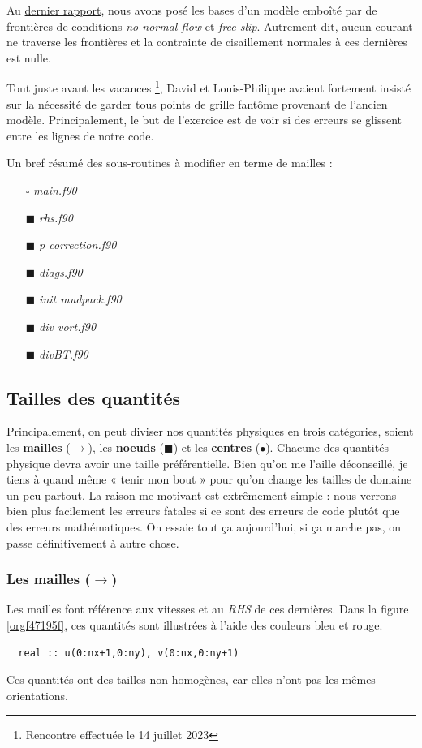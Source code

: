 \documentclass[10pt]{article}
\numberwithin{equation}{section}
\renewcommand{\boxtimes}{\blacksquare}
\begin{document}
Au \href{rapport-2023-07-07.org}{dernier rapport}, nous avons posé les bases d'un modèle emboîté par de frontières de conditions \emph{no normal flow} et \emph{free slip}.
Autrement dit, aucun courant ne traverse les frontières et la contrainte de cisaillement normales à ces dernières est nulle. \bigskip

Tout juste avant les vacances \footnote{Rencontre effectuée le 14 juillet 2023}, David et Louis-Philippe avaient fortement insisté sur la nécessité de garder tous points de grille fantôme provenant de l'ancien modèle.
Principalement, le but de l'exercice est de voir si des erreurs se glissent entre les lignes de notre code. \bigskip

Un bref résumé des sous-routines à modifier en terme de mailles : 
\begin{itemize}
\item[{$\square$}] \emph{main.f90}
\item[{$\boxtimes$}] \emph{rhs.f90}
\item[{$\boxtimes$}] \emph{p correction.f90}
\item[{$\boxtimes$}] \emph{diags.f90}
\item[{$\boxtimes$}] \emph{init mudpack.f90}
\item[{$\boxtimes$}] \emph{div vort.f90}
\item[{$\boxtimes$}] \emph{divBT.f90}
\end{itemize}


\subsection{Tailles des quantités}
\label{sec:org7f68463}
Principalement, on peut diviser nos quantités physiques en trois catégories, soient les \textbf{mailles} (\(\rightarrow\)), les \textbf{noeuds} (\(\blacksquare\)) et les \textbf{centres} (\(\bullet\)).
Chacune des quantités physique devra avoir une taille préférentielle.
Bien qu'on me l'aille déconseillé, je tiens à quand même « tenir mon bout » pour qu'on change les tailles de domaine un peu partout.
La raison me motivant est extrêmement simple : nous verrons bien plus facilement les erreurs fatales si ce sont des erreurs de code plutôt que des erreurs mathématiques.
On essaie tout ça aujourd'hui, si ça marche pas, on passe définitivement à autre chose.

\subsubsection{Les mailles (\(\rightarrow\))}
\label{sec:org390065d}
Les mailles font référence aux vitesses et au \emph{RHS} de ces dernières. 
Dans la figure \ref{orgf47195f}, ces quantités sont illustrées à l'aide des couleurs bleu et rouge.
\begin{verbatim}
  real :: u(0:nx+1,0:ny), v(0:nx,0:ny+1)
\end{verbatim}
Ces quantités ont des tailles non-homogènes, car elles n'ont pas les mêmes orientations.
\end{document}
